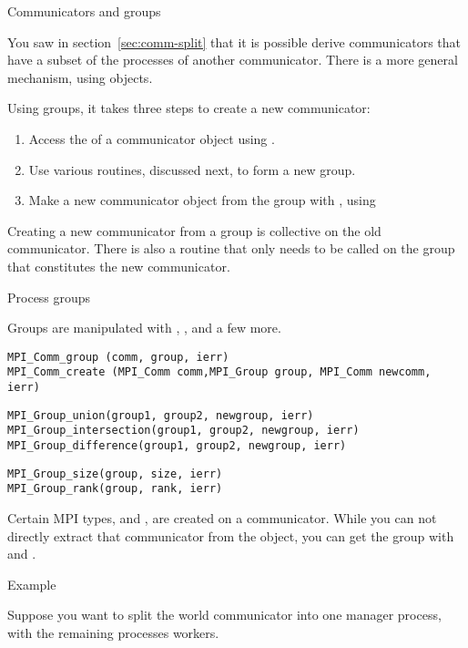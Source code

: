 
 {Communicators and groups}
\label{sec:mpi-comm-group}

You saw in section~\ref{sec:comm-split} that it is possible derive
communicators that have a subset of the processes of another communicator.
There is a more general mechanism, using 
objects.

Using groups, it takes three steps to create a new communicator:
\begin{enumerate}
\item Access the  of a communicator
  object using .
\item Use various routines, discussed next, to form a new group.
\item Make a new communicator object from the group with
  , using
\end{enumerate}

Creating a new communicator from a group is collective on the old communicator.
There is also a routine  that only
needs to be called on the group that constitutes the new communicator.

 {Process groups}
\label{sec:comm-group}

Groups are manipulated with
,
,
 and a few more.

\begin{lstlisting}
MPI_Comm_group (comm, group, ierr)
MPI_Comm_create (MPI_Comm comm,MPI_Group group, MPI_Comm newcomm, ierr)
\end{lstlisting}

\begin{lstlisting}
MPI_Group_union(group1, group2, newgroup, ierr)
MPI_Group_intersection(group1, group2, newgroup, ierr)
MPI_Group_difference(group1, group2, newgroup, ierr)
\end{lstlisting}

\begin{lstlisting}
MPI_Group_size(group, size, ierr)
MPI_Group_rank(group, rank, ierr)
\end{lstlisting}

Certain MPI types,  and ,
are created on a communicator.
While you can not directly extract that communicator from the object,
you can get the group with
 and .

 {Example}

Suppose you want to split the world communicator into
one manager process, with the remaining processes workers.
%
